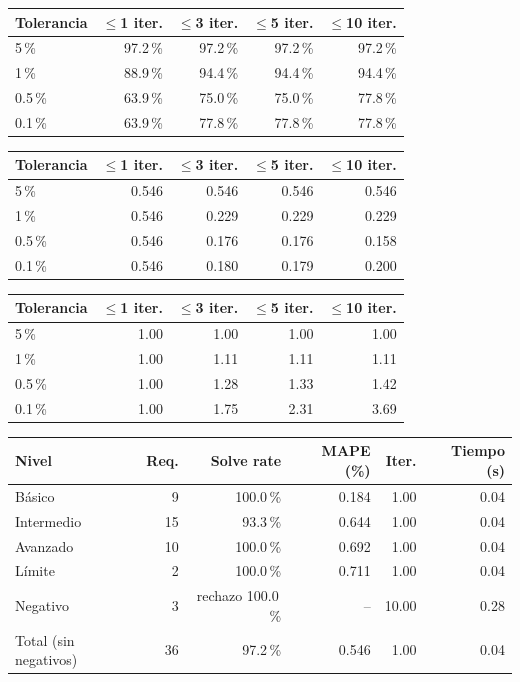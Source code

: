 \begin{tabular}{lrrrr}
\toprule
\textbf{Tolerancia} & \textbf{$\leq$1 iter.} & \textbf{$\leq$3 iter.} & \textbf{$\leq$5 iter.} & \textbf{$\leq$10 iter.} \\
\midrule
5\,\% & 97.2\,\% & 97.2\,\% & 97.2\,\% & 97.2\,\% \\
1\,\% & 88.9\,\% & 94.4\,\% & 94.4\,\% & 94.4\,\% \\
0.5\,\% & 63.9\,\% & 75.0\,\% & 75.0\,\% & 77.8\,\% \\
0.1\,\% & 63.9\,\% & 77.8\,\% & 77.8\,\% & 77.8\,\% \\
\bottomrule
\end{tabular}

\begin{tabular}{lrrrr}
\toprule
\textbf{Tolerancia} & \textbf{$\leq$1 iter.} & \textbf{$\leq$3 iter.} & \textbf{$\leq$5 iter.} & \textbf{$\leq$10 iter.} \\
\midrule
5\,\% & 0.546 & 0.546 & 0.546 & 0.546 \\
1\,\% & 0.546 & 0.229 & 0.229 & 0.229 \\
0.5\,\% & 0.546 & 0.176 & 0.176 & 0.158 \\
0.1\,\% & 0.546 & 0.180 & 0.179 & 0.200 \\
\bottomrule
\end{tabular}

\begin{tabular}{lrrrr}
\toprule
\textbf{Tolerancia} & \textbf{$\leq$1 iter.} & \textbf{$\leq$3 iter.} & \textbf{$\leq$5 iter.} & \textbf{$\leq$10 iter.} \\
\midrule
5\,\% & 1.00 & 1.00 & 1.00 & 1.00 \\
1\,\% & 1.00 & 1.11 & 1.11 & 1.11 \\
0.5\,\% & 1.00 & 1.28 & 1.33 & 1.42 \\
0.1\,\% & 1.00 & 1.75 & 2.31 & 3.69 \\
\bottomrule
\end{tabular}

\begin{tabular}{lrrrrr}
\toprule
\textbf{Nivel} & \textbf{Req.} & \textbf{Solve rate} & \textbf{MAPE (\%)} & \textbf{Iter.} & \textbf{Tiempo (s)} \\
\midrule
Básico & 9 & 100.0\,\% & 0.184 & 1.00 & 0.04 \\
Intermedio & 15 & 93.3\,\% & 0.644 & 1.00 & 0.04 \\
Avanzado & 10 & 100.0\,\% & 0.692 & 1.00 & 0.04 \\
Límite & 2 & 100.0\,\% & 0.711 & 1.00 & 0.04 \\
Negativo & 3 & rechazo 100.0\,\% & -- & 10.00 & 0.28 \\
Total (sin negativos) & 36 & 97.2\,\% & 0.546 & 1.00 & 0.04 \\
\bottomrule
\end{tabular}

